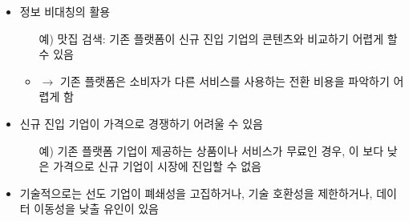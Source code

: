 \begin{itemize}
	\begin{itemize}
	\item 정보 비대칭의 활용
		\begin{itemize}
		\item[예)] 맛집 검색: 기존 플랫폼이 신규 진입 기업의 콘텐츠와 비교하기 어렵게 할 수 있음
		\item $\rightarrow$ 기존 플랫폼은 소비자가 다른 서비스를 사용하는 전환 비용을 파악하기 어렵게 함
		\end{itemize}
	\item 신규 진입 기업이 가격으로 경쟁하기 어려울 수 있음
		\begin{itemize}
		\item[예)] 기존 플랫폼 기업이 제공하는 상품이나 서비스가 무료인 경우, 이 보다 낮은 가격으로 신규 기업이 시장에 진입할 수 없음
		\end{itemize}	
	\item 기술적으로는 선도 기업이 폐쇄성을 고집하거나, 기술 호환성을 제한하거나, 데이터 이동성을 낮출 유인이 있음
	\end{itemize}
\end{itemize}

